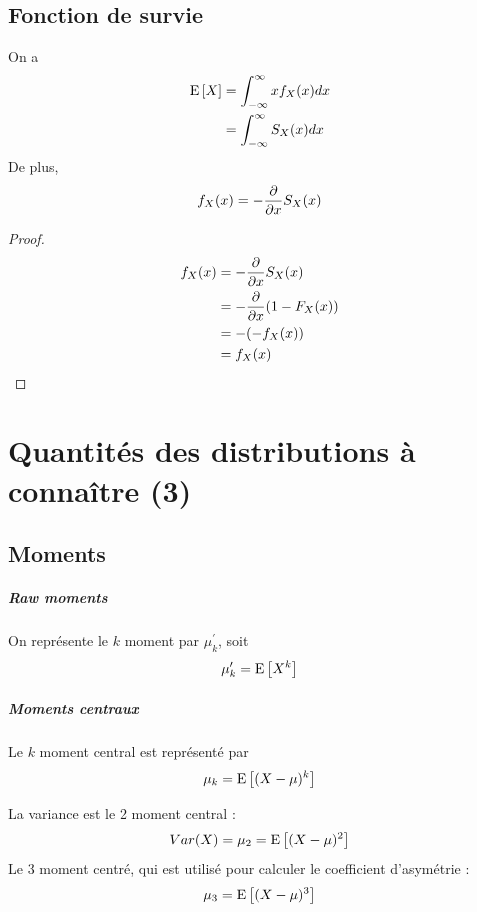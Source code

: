 \documentclass[12pt, french]{report}
\begin{document}
\section{Fonction de survie}
On a
\begin{align*}
\mathrm{E} \left[ X \right] & = \int_{-\infty}^{\infty} x f_X(x) dx \\
	& = \int_{-\infty}^{\infty} S_X(x) dx \\
\end{align*}
De plus,
\begin{align*}
f_X(x) = - \frac{\partial}{\partial x} S_X(x)
\end{align*}
\begin{proof}
\begin{align*}
f_X(x)	&  =-  \frac{\partial}{\partial x} S_X(x)  \\
	&=-  \frac{\partial}{\partial x} (1  - F_X(x))  \\
	& = - (- f_X(x)) \\
	& = f_X(x) \\
\end{align*}
\end{proof}





\chapter{Quantités des distributions à connaître (3)}
\section{Moments}

\paragraph{\textit{Raw moments}}
On représente le $k$ moment par $\mu_k^\prime$, soit
\begin{equation}
\mu_k^\prime = \mathrm{E} \left[ X^k \right] 
\end{equation}

\paragraph{Moments centraux} Le $k$ moment central est représenté par
\begin{equation}
\mu_k = \mathrm{E} \left[ (X - \mu)^k \right]
\end{equation}

\begin{exemple}
La variance est le 2 moment central : 
\begin{align*}
Var(X) = \mu_2 =  \mathrm{E} \left[ (X - \mu)^2 \right] \\
\end{align*}
Le 3 moment centré, qui est utilisé pour calculer le coefficient d'asymétrie : 
\begin{align*}
\mu_3 = \mathrm{E} \left[ (X-\mu)^3 \right]
\end{align*}
\end{exemple}
\end{document}

